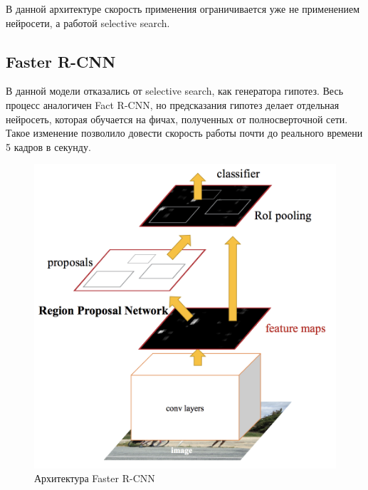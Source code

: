 \documentclass{article}
\begin{document}
	В данной архитектуре скорость применения ограничивается уже не применением нейросети, а работой selective search.
	\subsection{Faster R-CNN}
	В данной модели отказались от selective search, как генератора гипотез. Весь процесс аналогичен Fact R-CNN, но предсказания гипотез делает отдельная нейросеть, которая обучается на фичах, полученных от полносверточной сети. Такое изменение позволило довести скорость работы почти до реального времени 5 кадров в секунду. 
	\begin{figure}[H]
	    \begin{center}
        \includegraphics[width=0.4\linewidth]{Faster.png}
        \caption{Архитектура Faster R-CNN}
        \end{center}
    \end{figure}
	
\end{document}
